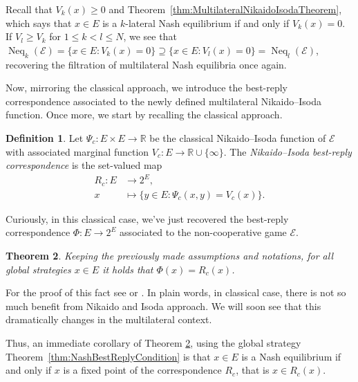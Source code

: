 \documentclass[a4paper,11pt,reqno,english]{amsart}
\theoremstyle{plain}
\newtheorem{theorem}{Theorem}[section]
\theoremstyle{definition}
\newtheorem{definition}[theorem]{Definition}
\newcommand{\Ecal}{\mathcal{E}}
\DeclareMathOperator{\NashEquilibria}{Neq}
\begin{document}
Recall that $V_k(x)\geq 0$ and Theorem~\ref{thm:MultilateralNikaidoIsodaTheorem}, which says that $x\in E$ is a $k$-lateral Nash equilibrium if and only if $V_k(x)=0$.
If $V_l \geq V_k$ for $1\leq k < l \leq N$, we see that $\NashEquilibria_k(\Ecal) = \{x\in E\colon V_k(x)=0\}\supseteq\{x\in E\colon V_l(x)=0\} = \NashEquilibria_l(\Ecal)$, recovering the filtration of multilateral Nash equilibria once again.




\medskip
Now, mirroring the classical approach, we introduce the best-reply correspondence associated to the newly defined multilateral
Nikaido--Isoda function.
Once more, we start by recalling the classical approach.

\begin{definition}\label{def:ClassicalNIBestReply}
	Let $\Psi_c\colon E\times E\longrightarrow \mathbb{R}$ be the classical Nikaido--Isoda function of $\Ecal$ with associated marginal function $V_c\colon E\longrightarrow\mathbb{R}\cup\{\infty\}$.
	The {\em Nikaido--Isoda best-reply correspondence} is the set-valued map
	\begin{align*}
		R_c\colon E & \longrightarrow 2^{E},                       \\
		x           & \longmapsto \{y\in E : \Psi_c(x,y)=V_c(x)\}.
	\end{align*}
\end{definition}

Curiously, in this classical case, we've just recovered the best-reply correspondence $\Phi\colon E\longrightarrow 2^{E}$ associated to the non-cooperative game $\Ecal$.
\begin{theorem}\label{thm:NIBestReplyEqualBestReplyClassic}
	Keeping the previously made assumptions and notations, for all global strategies $x\in E$ it holds that $\Phi(x) = R_c(x)$.
\end{theorem}

\medskip
For the proof of this fact see \cite{Blagojevic2024} or \cite[Prop.\,3.4]{blagojevic2025topologygeneralizednashequilibrium}.
In plain words, in classical case, there is not so much benefit from Nikaido and Isoda approach.
We will soon see that this dramatically changes in the multilateral context.

\medskip
Thus, an immediate corollary of Theorem \ref{thm:NIBestReplyEqualBestReplyClassic}, using the global strategy Theorem~\ref{thm:NashBestReplyCondition} is that $x\in E$ is a Nash equilibrium if and only if $x$ is a fixed point of the correspondence $R_c$, that is $x\in R_c(x)$.
\end{document}
